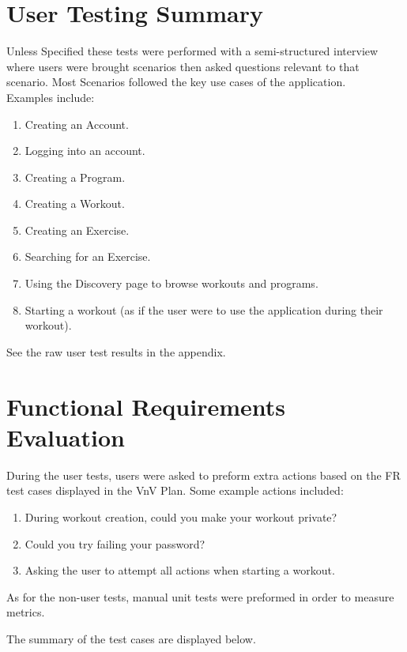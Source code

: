 \documentclass[12pt, titlepage]{article}
\begin{document}
\section{User Testing Summary}
Unless Specified these tests were performed with a semi-structured interview where users were brought scenarios then asked questions relevant to that scenario. Most Scenarios followed the key use cases of the application.\\
Examples include:
\begin{enumerate}
	\item Creating an Account.
	\item Logging into an account.
	\item Creating a Program.
	\item Creating a Workout.
	\item Creating an Exercise.
	\item Searching for an Exercise.
	\item Using the Discovery page to browse workouts and programs.
	\item Starting a workout (as if the user were to use the application during their workout).
\end{enumerate}

See the raw user test results in the appendix.

\section{Functional Requirements Evaluation}


\noindent During the user tests, users were asked to preform extra actions based on the FR test cases displayed in the VnV Plan.
Some example actions included: \\
\begin{enumerate}
    \item During workout creation, could you make your workout private?
    \item Could you try failing your password?
    \item Asking the user to attempt all actions when starting a workout.
\end{enumerate}


\noindent As for the non-user tests, manual unit tests were preformed in order to measure metrics.


\noindent The summary of the test cases are displayed below.
\end{document}
